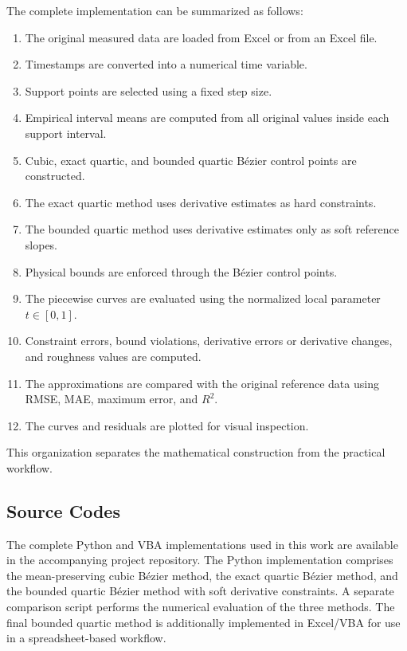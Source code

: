 \documentclass[12pt,a4paper]{article}
\begin{document}
The complete implementation can be summarized as follows:

\begin{enumerate}
    \item The original measured data are loaded from Excel or from an Excel file.
    \item Timestamps are converted into a numerical time variable.
    \item Support points are selected using a fixed step size.
    \item Empirical interval means are computed from all original values inside each support interval.
    \item Cubic, exact quartic, and bounded quartic B\'ezier control points are constructed.
    \item The exact quartic method uses derivative estimates as hard constraints.
    \item The bounded quartic method uses derivative estimates only as soft reference slopes.
    \item Physical bounds are enforced through the B\'ezier control points.
    \item The piecewise curves are evaluated using the normalized local parameter \(t\in[0,1]\).
    \item Constraint errors, bound violations, derivative errors or derivative changes, and roughness values are computed.
    \item The approximations are compared with the original reference data using RMSE, MAE, maximum error, and \(R^2\).
    \item The curves and residuals are plotted for visual inspection.
\end{enumerate}

This organization separates the mathematical construction from the practical
workflow.

\subsection{Source Codes}

The complete Python and VBA implementations used in this work are available
in the accompanying project repository. The Python implementation comprises
the mean-preserving cubic B\'ezier method, the exact quartic B\'ezier method,
and the bounded quartic B\'ezier method with soft derivative constraints.
A separate comparison script performs the numerical evaluation of the three
methods. The final bounded quartic method is additionally implemented in
Excel/VBA for use in a spreadsheet-based workflow.
\end{document}
